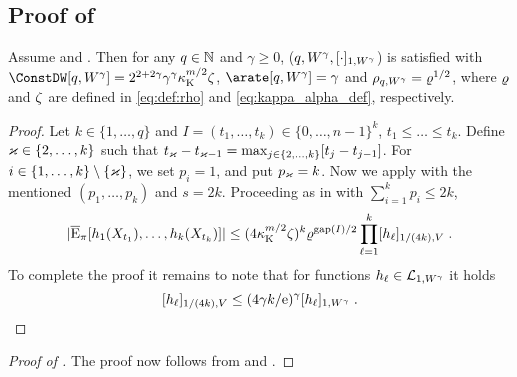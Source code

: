 \subsection{Proof of }
\label{sec:proof_ros_W_log}
\begin{lemma}
\label{lem:centered_moments_log_wasserstein}
Assume  and . Then for any $q \in \nset$ and $\gamma \geq 0$, ($q,W^{\gamma},\Nnorm[1,W^\gamma]{\cdot}$) is satisfied with $\ConstDW[q,W^\gamma] = 2^{2+2\gamma}\gamma^{\gamma}\boundmetric^{m/2}\constlemqnpi$, $\arate[q,W^\gamma] = \gamma$ and $\rho_{q,W^{\gamma}} = \ratewas^{1/2}$, where $\ratewas$ and $\constlemqnpi$ are defined in \eqref{eq:def:rho} and \eqref{eq:kappa_alpha_def}, respectively.
\end{lemma}

\begin{proof}
Let $k \in \{1,\ldots,q\}$ and $I = (t_1,\dots,t_{k}) \in \{0,\ldots,n-1\}^{k}$, $t_1 \leq \dots\leq t_{k}$. Define $\maxind \in \{2,\ldots,k\}$ such that $t_{\maxind} - t_{\maxind-1} = \max_{j \in \{2,\ldots,k\}} [t_j - t_{j-1}]$. For $i \in \{1,\ldots,k\} \setminus \{\maxind\}$, we set $p_{i} = 1$, and put $p_{\maxind} = k$. Now we apply  with the mentioned $(p_1,\dots, p_k)$ and $s = 2k$. Proceeding as in  with $\sum_{i=1}^k p_i \leq 2k$,
\begin{align*}
|\PEC_\pi[h_1(X_{t_1}), \ldots, h_k(X_{t_k})] |
\leq (4 \boundmetric^{m/2} \constlemqnpi)^{k} \ratewas^{\maxgap(I)/2} \prod_{\ell = 1}^k   \Nnorm[1/(4k), V]{h_{\ell}} \eqsp.
\end{align*}
To complete the proof it remains to note that for functions $h_{\ell} \in \Lclass_{1,W^{\gamma}}$ it holds
\begin{equation*}
\Nnorm[1/(4k), V]{h_{\ell}} \leq (4\gamma k/\rme)^{\gamma}\Nnorm[1, W^{\gamma}]{h_{\ell}}\eqsp.
\end{equation*}
\end{proof}

\begin{proof}[Proof of ] The proof now follows from  and .
\end{proof}
